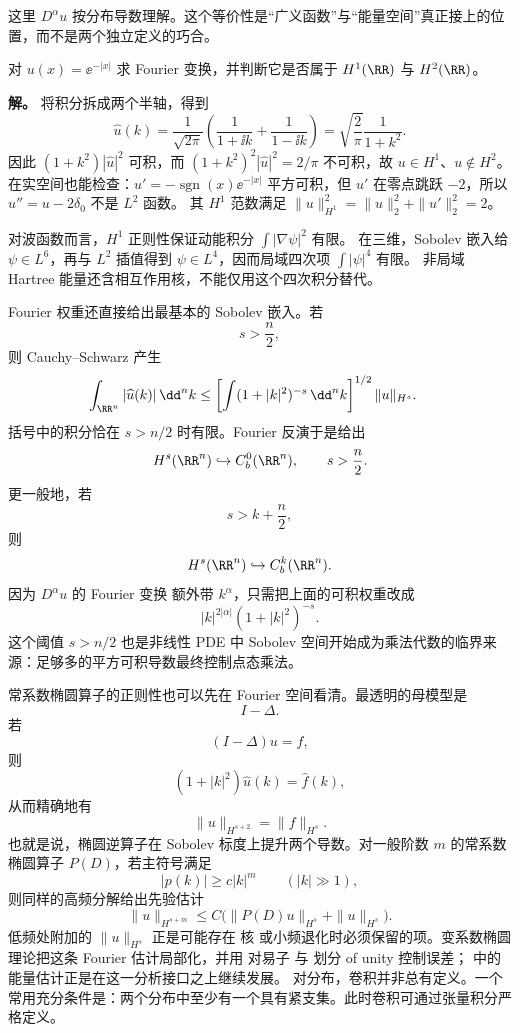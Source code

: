 这里 $D^\alpha u$ 按分布导数理解。这个等价性是“广义函数”与“能量空间”真正接上的位置，而不是两个独立定义的巧合。

\begin{workedexample}[尖点函数属于哪一阶能量空间]
对 $u(x)=\ee^{-|x|}$ 求 Fourier 变换，并判断它是否属于 $H^1(\RR)$ 与 $H^2(\RR)$。

\textbf{解。} 将积分拆成两个半轴，得到
\[
\widehat u(k)=\frac1{\sqrt{2\pi}}
\left(\frac1{1+\ii k}+\frac1{1-\ii k}\right)
=\sqrt{\frac2\pi}\frac1{1+k^2}.
\]
因此 $(1+k^2)|\widehat u|^2$ 可积，而 $(1+k^2)^2|\widehat u|^2=2/\pi$ 不可积，故 $u\in H^1$、$u\notin H^2$。
在实空间也能检查：$u'=-\operatorname{sgn}(x)\ee^{-|x|}$ 平方可积，但 $u'$ 在零点跳跃 $-2$，所以 $u''=u-2\delta_0$ 不是 $L^2$ 函数。
其 $H^1$ 范数满足 $\|u\|_{H^1}^2=\|u\|_2^2+\|u'\|_2^2=2$。
\end{workedexample}

对波函数而言，$H^1$ 正则性保证动能积分 $\int|\nabla\psi|^2$ 有限。
在三维，Sobolev 嵌入给 $\psi\in L^6$，再与 $L^2$ 插值得到 $\psi\in L^4$，因而局域四次项 $\int|\psi|^4$ 有限。
非局域 Hartree 能量还含相互作用核，不能仅用这个四次积分替代。

Fourier 权重还直接给出最基本的 Sobolev 嵌入。若
\[
s>\frac n2,
\]
则 Cauchy--Schwarz 产生
\begin{align*}
\int_{\RR^n}|\widehat u(k)|\,\dd^n k
&\le
\left[
\int(1+|k|^2)^{-s}\,\dd^n k
\right]^{1/2}
\|u\|_{H^s}.
\end{align*}
括号中的积分恰在 $s>n/2$ 时有限。Fourier 反演于是给出
\begin{equation*}{
H^s(\RR^n)\hookrightarrow C_b^0(\RR^n),
\qquad s>\frac n2.
}\end{equation*}
更一般地，若
\[
s>k+\frac n2,
\]
则
\begin{equation*}H^s(\RR^n)\hookrightarrow C_b^k(\RR^n).\end{equation*}
因为 $D^\alpha u$ 的 Fourier 变换 额外带 $k^\alpha$，只需把上面的可积权重改成
\[
|k|^{2|\alpha|}(1+|k|^2)^{-s}.
\]
这个阈值 $s>n/2$ 也是非线性 PDE 中 Sobolev 空间开始成为乘法代数的临界来源：足够多的平方可积导数最终控制点态乘法。

常系数椭圆算子的正则性也可以先在 Fourier 空间看清。最透明的母模型是
\[
I-\Delta.
\]
若
\begin{equation*}(I-\Delta)u=f,\end{equation*}
则
\[
(1+|k|^2)\widehat u(k)=\widehat f(k),
\]
从而精确地有
\begin{equation*}{
\|u\|_{H^{s+2}}
=\|f\|_{H^s}.
}\end{equation*}
也就是说，椭圆逆算子在 Sobolev 标度上提升两个导数。对一般阶数 $m$ 的常系数椭圆算子 $P(D)$，若主符号满足
\[
|p(k)|\ge c|k|^m
\qquad(|k|\gg1),
\]
则同样的高频分解给出先验估计
\begin{equation*}\|u\|_{H^{s+m}}
\le C\bigl(\|P(D)u\|_{H^s}+\|u\|_{H^s}\bigr).\end{equation*}
低频处附加的 $\|u\|_{H^s}$ 正是可能存在 核 或小频退化时必须保留的项。变系数椭圆理论把这条 Fourier 估计局部化，并用 对易子 与 划分 of unity 控制误差； 中的能量估计正是在这一分析接口之上继续发展。
对分布，卷积并非总有定义。一个常用充分条件是：两个分布中至少有一个具有紧支集。此时卷积可通过张量积分严格定义。

